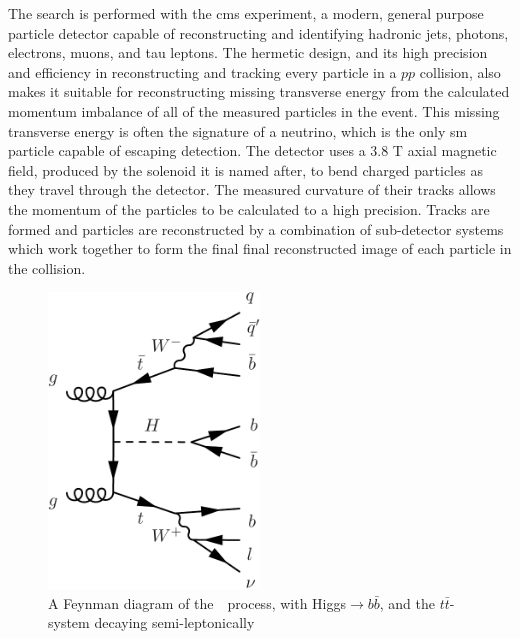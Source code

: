 \par The search is performed with the \acrshort{cms} experiment, a modern, general purpose particle detector capable of reconstructing and identifying hadronic jets, photons, electrons, muons, and tau leptons.  The hermetic design, and its high precision and efficiency in reconstructing and tracking every particle in a $pp$ collision, also makes it suitable for reconstructing missing transverse energy from the calculated momentum imbalance of all of the measured particles in the event.  This missing transverse energy is often the signature of a neutrino, which is the only \acrshort{sm} particle capable of escaping detection.  The detector uses a 3.8 T axial magnetic field, produced by the solenoid it is named after, to bend charged particles as they travel through the detector.  The measured curvature of their tracks allows the momentum of the particles to be calculated to a high precision.  Tracks are formed and particles are reconstructed by a combination of sub-detector systems which work together to form the final final reconstructed image of each particle in the collision.  

\begin{figure}[h]
   \centering
  \includegraphics[width=0.5\textwidth]{Figures/Feynman_Diagrams/higgs_production__tth_semileptonic.pdf}
  \caption{A Feynman diagram of the~\ttH~process, with Higgs$\rightarrow$$b\bar{b}$, and the $t\bar{t}$-system decaying semi-leptonically} \label{fd:ttH_semiLep}
\end{figure}

